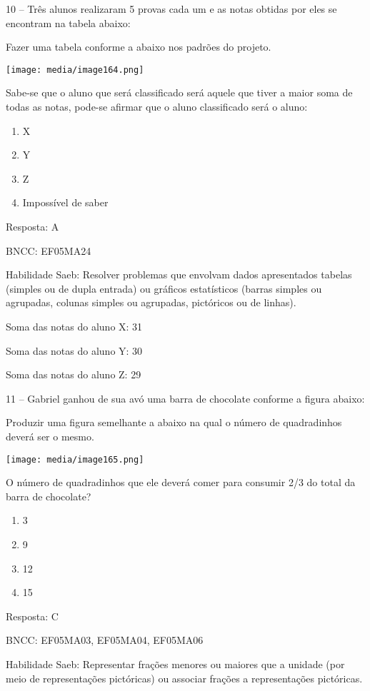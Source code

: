 10 -- Três alunos realizaram 5 provas cada um e as notas obtidas por
eles se encontram na tabela abaixo:

Fazer uma tabela conforme a abaixo nos padrões do projeto.

\texttt{[image: media/image164.png]}

Sabe-se que o aluno que será classificado será aquele que tiver a maior
soma de todas as notas, pode-se afirmar que o aluno classificado será o
aluno:

\begin{enumerate}
\def\labelenumi{\alph{enumi})}
\item
  X
\item
  Y
\item
  Z
\item
  Impossível de saber
\end{enumerate}

Resposta: A

BNCC: EF05MA24

Habilidade Saeb: Resolver problemas que envolvam dados apresentados
tabelas (simples ou de dupla entrada) ou gráficos estatísticos (barras
simples ou agrupadas, colunas simples ou agrupadas, pictóricos ou de
linhas).

Soma das notas do aluno X: 31

Soma das notas do aluno Y: 30

Soma das notas do aluno Z: 29

11 -- Gabriel ganhou de sua avó uma barra de chocolate conforme a figura
abaixo:

Produzir uma figura semelhante a abaixo na qual o número de quadradinhos
deverá ser o mesmo.

\texttt{[image: media/image165.png]}

O número de quadradinhos que ele deverá comer para consumir 2/3 do total
da barra de chocolate?

\begin{enumerate}
\def\labelenumi{\alph{enumi})}
\item
  3
\item
  9
\item
  12
\item
  15
\end{enumerate}

Resposta: C

BNCC: EF05MA03, EF05MA04, EF05MA06

Habilidade Saeb: Representar frações menores ou maiores que a unidade
(por meio de representações pictóricas) ou associar frações a
representações pictóricas.

